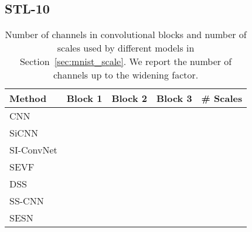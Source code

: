 \documentclass{article} \usepackage{multirow}
\def\Secref#1{Section~\ref{#1}}
\begin{document}
\subsection{STL-10}
\begin{table}[h]
    \begin{center}
    \begin{tabular}{l|ccc|c}
    \toprule
    Method                & Block 1 & Block 2 & Block 3 & \# Scales              \\ 
    \midrule
    CNN                   &      &      &     &                                                \\
    SiCNN                 &      &      &    &         \\
    SI-ConvNet                &      &      &     &         \\
SEVF            &      &      &    &      \\
    DSS                   &      &      &    &                    \\
    SS-CNN                &      &      &     &                                                 \\
    SESN                  &      &      &     &                                               \\       
    \bottomrule                             
    \end{tabular}
    \end{center}
    \caption{Number of channels in convolutional blocks 
    and number of scales used by different models in \Secref{sec:mnist_scale}. 
    We report the number of channels up to the widening factor.}
    \label{tab:appendix_arch_mnist}
\end{table} 
\end{document}
